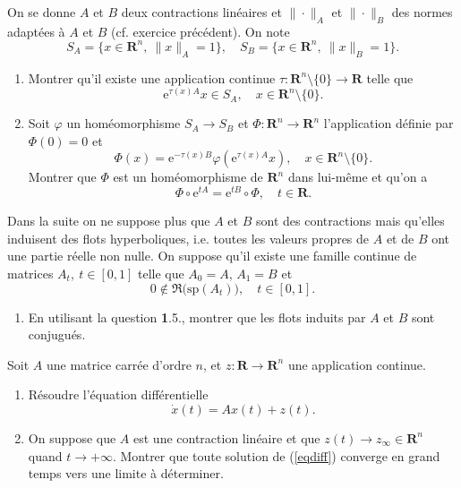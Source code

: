 \documentclass[a4paper,10pt,openany]{article}
\theoremstyle{plain}
\theoremstyle{definition}
\newcommand{\e}{\mathrm{e}}
\newcommand{\R}{\mathbf{R}}
\begin{document}
\noindent On se donne $A$ et $B$ deux contractions lin\'eaires et $\|\cdot\|_A$ et $\|\cdot\|_B$ des normes adapt\'ees \`a $A$ et $B$ (cf. exercice pr\'ec\'edent). On note
$$
S_A = \{x \in \R^n, ~\|x\|_A = 1\}, \quad S_B = \{x \in \R^n, ~\|x\|_B = 1\}.
$$
\begin{enumerate}
\item Montrer qu'il existe une application continue $\tau : \R^n \setminus \{0\} \to \R$ telle que
$$
\e^{\tau(x)A}x \in S_A, \quad x \in \R^n\setminus \{0\}.
$$
\item Soit $\varphi$ un hom\'eomorphisme $S_A \to S_B$ et $\Phi : \R^n \to \R^n$ l'application d\'efinie par $\Phi(0) = 0$ et 
$$
\Phi(x) =  \e^{-\tau(x)B} \varphi\left( \e^{\tau(x)A}x\right), \quad x \in \R^n \setminus \{0\}.
$$
Montrer que $\Phi$ est un hom\'eomorphisme de $\R^n$ dans lui-m\^eme et qu'on a
$$
\Phi \circ \e^{tA} = \e^{tB} \circ \Phi, \quad t \in \R.
$$
\end{enumerate}
Dans la suite on ne suppose plus que $A$ et $B$ sont des contractions mais qu'elles induisent des flots hyperboliques, i.e. toutes les valeurs propres de $A$ et de $B$ ont une partie r\'eelle non nulle.
On suppose qu'il existe une famille continue de matrices $A_t,~t\in [0,1]$ telle que $A_0 = A$, $A_1 =B$ et
$$
0 \notin \Re\bigl(\mathrm{sp}(A_t)\bigr), \quad t \in [0,1].
$$
\begin{enumerate}[resume]
\item En utilisant la question \textbf{1}.5., montrer que les flots induits par $A$ et $B$ sont conjugu\'es.
\end{enumerate}

\vspace{0.6cm}

 \vspace{1.5mm} 

\noindent Soit $A$ une matrice carr\'ee d'ordre $n$, et $z : \R \to \R^n$ une application continue. 

\begin{enumerate}
\item R\'esoudre l'\'equation diff\'erentielle 
\begin{equation}\label{eqdiff}
\dot{x}(t) = A x(t) + z(t).
\end{equation}
\item On suppose que $A$ est une contraction lin\'eaire et que $z(t) \to z_\infty \in \R^n$ quand $t \to +\infty$. Montrer que toute solution de (\ref{eqdiff}) converge en grand temps vers une limite \`a d\'eterminer.
\end{enumerate}
\end{document}

